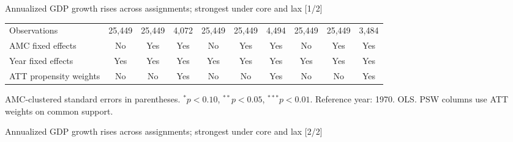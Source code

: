 \documentclass[aspectratio=169]{beamer}
\begin{document}
\begin{frame}{Annualized GDP growth rises across assignments; strongest under core and lax [1/2]}
{\begin{tabular}{@{}l*{9}{c}@{}}
\midrule
Observations & 25,449 & 25,449 & 4,072 & 25,449 & 25,449 & 4,494 & 25,449 & 25,449 & 3,484 \\
AMC fixed effects & No & Yes & Yes & No & Yes & Yes & No & Yes & Yes \\
Year fixed effects & Yes & Yes & Yes & Yes & Yes & Yes & Yes & Yes & Yes \\
ATT propensity weights & No & No & Yes & No & No & Yes & No & No & Yes \\
\bottomrule
\end{tabular}%
}
\vspace{0.1em}
{\tiny\color{ZMidGray} AMC-clustered standard errors in parentheses. $^{*}p<0.10$, $^{**}p<0.05$, $^{***}p<0.01$. Reference year: 1970. OLS. PSW columns use ATT weights on common support.}
\end{frame}
\begin{frame}{Annualized GDP growth rises across assignments; strongest under core and lax [2/2]}
\centering
\scriptsize
\setlength{\tabcolsep}{2.1pt}
\renewcommand{\arraystretch}{0.68}
\end{frame}
\end{document}
